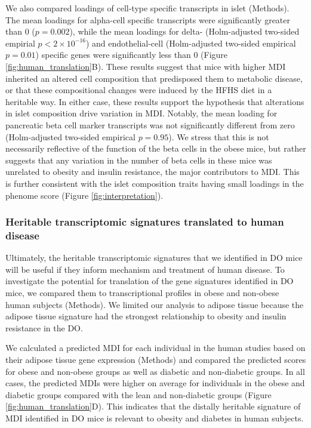 \documentclass[
]{article}
\begin{document}
We also compared loadings of cell-type specific transcripts in islet
(Methods). The mean loadings for alpha-cell specific transcripts were
significantly greater than 0 (\(p = 0.002\)), while the mean loadings
for delta- (Holm-adjusted two-sided empirial \(p < 2\times10^{-16}\))
and endothelial-cell (Holm-adjusted two-sided empirical \(p = 0.01\))
specific genes were significantly less than 0 (Figure
\ref{fig:human_translation}B). These results suggest that mice with
higher MDI inherited an altered cell composition that predisposed them
to metabolic disease, or that these compositional changes were induced
by the HFHS diet in a heritable way. In either case, these results
support the hypothesis that alterations in islet composition drive
variation in MDI. Notably, the mean loading for pancreatic beta cell
marker transcripts was not significantly different from zero
(Holm-adjusted two-sided empirical \(p = 0.95\)). We stress that this is
not necessarily reflective of the function of the beta cells in the
obese mice, but rather suggests that any variation in the number of beta
cells in these mice was unrelated to obesity and insulin resistance, the
major contributors to MDI. This is further consistent with the islet
composition traits having small loadings in the phenome score (Figure
\ref{fig:interpretation}).

\subsubsection{Heritable transcriptomic signatures translated to human
disease}\label{heritable-transcriptomic-signatures-translated-to-human-disease}

Ultimately, the heritable transcriptomic signatures that we identified
in DO mice will be useful if they inform mechanism and treatment of
human disease. To investigate the potential for translation of the gene
signatures identified in DO mice, we compared them to transcriptional
profiles in obese and non-obese human subjects (Methods). We limited our
analysis to adipose tissue because the adipose tissue signature had the
strongest relationship to obesity and insulin resistance in the DO.

We calculated a predicted MDI for each individual in the human studies
based on their adipose tissue gene expression (Methods) and compared the
predicted scores for obese and non-obese groups as well as diabetic and
non-diabetic groups. In all cases, the predicted MDIs were higher on
average for individuals in the obese and diabetic groups compared with
the lean and non-diabetic groups (Figure \ref{fig:human_translation}D).
This indicates that the distally heritable signature of MDI identified
in DO mice is relevant to obesity and diabetes in human subjects.
\end{document}
